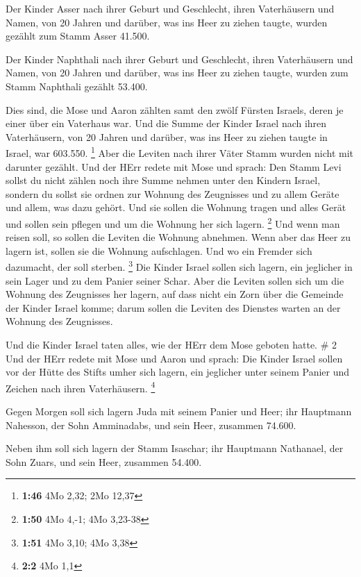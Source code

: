 Der Kinder Asser nach ihrer Geburt und Geschlecht, ihren
Vaterhäusern und Namen, von 20 Jahren und darüber, was ins Heer zu
ziehen taugte,  wurden gezählt zum Stamm Asser 41.500.

 Der Kinder Naphthali nach ihrer Geburt und Geschlecht,
ihren Vaterhäusern und Namen, von 20 Jahren und darüber, was ins Heer zu
ziehen taugte,  wurden zum Stamm Naphthali gezählt 53.400.

 Dies sind, die Mose und Aaron zählten samt den zwölf
Fürsten Israels, deren je einer über ein Vaterhaus war. 
Und die Summe der Kinder Israel nach ihren Vaterhäusern, von 20 Jahren
und darüber, was ins Heer zu ziehen taugte in Israel,  war
603.550. \footnote{\textbf{1:46} 4Mo 2,32; 2Mo 12,37}  Aber
die Leviten nach ihrer Väter Stamm wurden nicht mit darunter gezählt.
 Und der HErr redete mit Mose und sprach:  Den
Stamm Levi sollst du nicht zählen noch ihre Summe nehmen unter den
Kindern Israel,  sondern du sollst sie ordnen zur Wohnung
des Zeugnisses und zu allem Geräte und allem, was dazu gehört. Und sie
sollen die Wohnung tragen und alles Gerät und sollen sein pflegen und um
die Wohnung her sich lagern. \footnote{\textbf{1:50} 4Mo 4,-1; 4Mo
  3,23-38}  Und wenn man reisen soll, so sollen die Leviten
die Wohnung abnehmen. Wenn aber das Heer zu lagern ist, sollen sie die
Wohnung aufschlagen. Und wo ein Fremder sich dazumacht, der soll
sterben. \footnote{\textbf{1:51} 4Mo 3,10; 4Mo 3,38}  Die
Kinder Israel sollen sich lagern, ein jeglicher in sein Lager und zu dem
Panier seiner Schar.  Aber die Leviten sollen sich um die
Wohnung des Zeugnisses her lagern, auf dass nicht ein Zorn über die
Gemeinde der Kinder Israel komme; darum sollen die Leviten des Dienstes
warten an der Wohnung des Zeugnisses.

 Und die Kinder Israel taten alles, wie der HErr dem Mose
geboten hatte. \# 2  Und der HErr redete mit Mose und Aaron
und sprach:  Die Kinder Israel sollen vor der Hütte des
Stifts umher sich lagern, ein jeglicher unter seinem Panier und Zeichen
nach ihren Vaterhäusern. \footnote{\textbf{2:2} 4Mo 1,1}

 Gegen Morgen soll sich lagern Juda mit seinem Panier und
Heer; ihr Hauptmann Nahesson, der Sohn Amminadabs,  und sein
Heer, zusammen 74.600.

 Neben ihm soll sich lagern der Stamm Isaschar; ihr
Hauptmann Nathanael, der Sohn Zuars,  und sein Heer,
zusammen 54.400.

